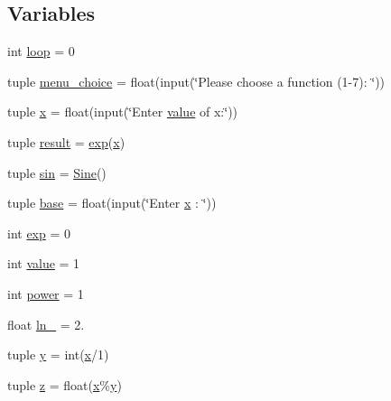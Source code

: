\subsection*{Variables}
\begin{DoxyCompactItemize}
\item 
int \hyperlink{namespaceprometheus__cli_a36714b394f122ad75824a9f836776164}{loop} = 0
\item 
tuple \hyperlink{namespaceprometheus__cli_af508c0b6bedd92457532fb08d8adc604}{menu\+\_\+choice} = float(input(\char`\"{}Please choose a function (1-\/7)\+: \char`\"{}))
\item 
tuple \hyperlink{namespaceprometheus__cli_a879d50c5fa9ad1ef941818d332417a9b}{x} = float(input(\char`\"{}Enter \hyperlink{namespaceprometheus__cli_af2e459ba025b091aa627434dd12f5dec}{value} of x\+:\char`\"{}))
\item 
tuple \hyperlink{namespaceprometheus__cli_a1caa8b4d9cffd1582d3b02cb1d0256f5}{result} = \hyperlink{namespaceprometheus__cli_a9960f27dbe4911d245ba1796856b86ba}{exp}(\hyperlink{namespaceprometheus__cli_a879d50c5fa9ad1ef941818d332417a9b}{x})
\item 
tuple \hyperlink{namespaceprometheus__cli_a5c0a64b81243c8257badc58cb7c9dbf3}{sin} = \hyperlink{classprometheus__cli_1_1_sine}{Sine}()
\item 
tuple \hyperlink{namespaceprometheus__cli_a164ebd98fae6402888e58217dfac6aca}{base} = float(input(\char`\"{}Enter \hyperlink{namespaceprometheus__cli_a879d50c5fa9ad1ef941818d332417a9b}{x} \+: \char`\"{}))
\item 
int \hyperlink{namespaceprometheus__cli_a9960f27dbe4911d245ba1796856b86ba}{exp} = 0
\item 
int \hyperlink{namespaceprometheus__cli_af2e459ba025b091aa627434dd12f5dec}{value} = 1
\item 
int \hyperlink{namespaceprometheus__cli_a563c4ef179440cea6d253df08af29fdb}{power} = 1
\item 
float \hyperlink{namespaceprometheus__cli_a46ac4e09c2a42fb1e4fa853ee0df0e5e}{ln\+\_} = 2.
\item 
tuple \hyperlink{namespaceprometheus__cli_accf154f79f78ac17fe06c8028e3da02d}{y} = int(\hyperlink{namespaceprometheus__cli_a879d50c5fa9ad1ef941818d332417a9b}{x}/1)
\item 
tuple \hyperlink{namespaceprometheus__cli_a1ca8916acd7686537567d5dd0466eeea}{z} = float(\hyperlink{namespaceprometheus__cli_a879d50c5fa9ad1ef941818d332417a9b}{x}\%\hyperlink{namespaceprometheus__cli_accf154f79f78ac17fe06c8028e3da02d}{y})

\end{DoxyCompactItemize}

